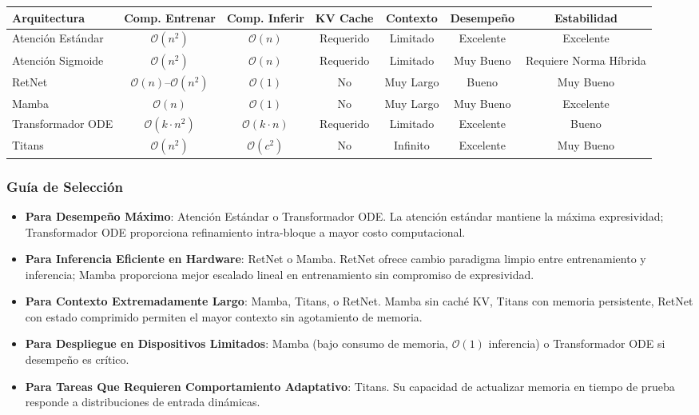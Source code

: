 \documentclass[11pt,a4paper]{article}
\begin{document}
\begin{center}
\begin{tabular}{|l|c|c|c|c|c|c|}
\hline
\textbf{Arquitectura} & \textbf{Comp. Entrenar} & \textbf{Comp. Inferir} & \textbf{KV Cache} & \textbf{Contexto} & \textbf{Desempeño} & \textbf{Estabilidad} \\
\hline
Atención Estándar & $\mathcal{O}(n^2)$ & $\mathcal{O}(n)$ & Requerido & Limitado & Excelente & Excelente \\
\hline
Atención Sigmoide & $\mathcal{O}(n^2)$ & $\mathcal{O}(n)$ & Requerido & Limitado & Muy Bueno & Requiere Norma Híbrida \\
\hline
RetNet & $\mathcal{O}(n)$--$\mathcal{O}(n^2)$ & $\mathcal{O}(1)$ & No & Muy Largo & Bueno & Muy Bueno \\
\hline
Mamba & $\mathcal{O}(n)$ & $\mathcal{O}(1)$ & No & Muy Largo & Muy Bueno & Excelente \\
\hline
Transformador ODE & $\mathcal{O}(k \cdot n^2)$ & $\mathcal{O}(k \cdot n)$ & Requerido & Limitado & Excelente & Bueno \\
\hline
Titans & $\mathcal{O}(n^2)$ & $\mathcal{O}(c^2)$ & No & Infinito & Excelente & Muy Bueno \\
\hline
\end{tabular}
\end{center}

\subsubsection{Guía de Selección}

\begin{itemize}[leftmargin=*]
\item \textbf{Para Desempeño Máximo}: Atención Estándar o Transformador ODE. La atención estándar mantiene la máxima expresividad; Transformador ODE proporciona refinamiento intra-bloque a mayor costo computacional.

\item \textbf{Para Inferencia Eficiente en Hardware}: RetNet o Mamba. RetNet ofrece cambio paradigma limpio entre entrenamiento y inferencia; Mamba proporciona mejor escalado lineal en entrenamiento sin compromiso de expresividad.

\item \textbf{Para Contexto Extremadamente Largo}: Mamba, Titans, o RetNet. Mamba sin caché KV, Titans con memoria persistente, RetNet con estado comprimido permiten el mayor contexto sin agotamiento de memoria.

\item \textbf{Para Despliegue en Dispositivos Limitados}: Mamba (bajo consumo de memoria, $\mathcal{O}(1)$ inferencia) o Transformador ODE si desempeño es crítico.

\item \textbf{Para Tareas Que Requieren Comportamiento Adaptativo}: Titans. Su capacidad de actualizar memoria en tiempo de prueba responde a distribuciones de entrada dinámicas.
\end{itemize}
\end{document}
